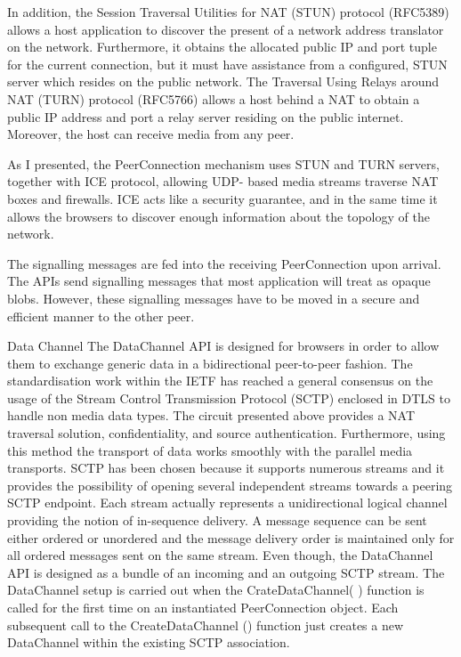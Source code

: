 In addition, the Session Traversal Utilities for NAT (STUN) protocol (RFC5389) allows a host application to discover the present of a network address translator on the network. Furthermore, it obtains the allocated public IP and port tuple for the current connection, but it must have assistance from a configured, STUN server which resides on the public network. The Traversal Using Relays around NAT (TURN) protocol (RFC5766) allows a host behind a NAT to obtain a public IP address and port a relay server residing on the public internet. Moreover, the host can receive media from any peer. 

As I presented, the PeerConnection mechanism uses STUN and TURN servers, together with ICE protocol, allowing UDP- based media streams traverse NAT boxes and firewalls. ICE acts like a security guarantee, and in the same time it allows the browsers to discover enough information about the topology of the network. 

The signalling messages are fed into the receiving PeerConnection upon arrival. The APIs send signalling messages that most application will treat as opaque blobs. However, these signalling messages have to be moved in a secure and efficient manner to the other peer. 

Data Channel 
The DataChannel API is designed for browsers in order to allow them to exchange generic data in a bidirectional peer-to-peer fashion. The standardisation work within the IETF has reached a general consensus on the usage of the Stream Control Transmission Protocol (SCTP) enclosed in DTLS to handle non media data types. The circuit presented above provides a NAT traversal solution, confidentiality, and source authentication. Furthermore, using this method the transport of data works smoothly with the parallel media transports. SCTP has been chosen because it supports numerous streams and it provides the possibility of opening several independent streams towards a peering SCTP endpoint. Each stream actually represents a unidirectional logical channel providing the notion of in-sequence delivery. A message sequence can be sent either ordered or unordered and the message delivery  order is maintained only for all ordered messages sent on the same stream. Even though, the DataChannel API is designed as a bundle of an incoming and an outgoing SCTP stream. The DataChannel setup is carried out when the CrateDataChannel( ) function is called for the first time on an instantiated PeerConnection object. Each subsequent call to the CreateDataChannel () function just creates a new DataChannel within the existing SCTP association. 


























